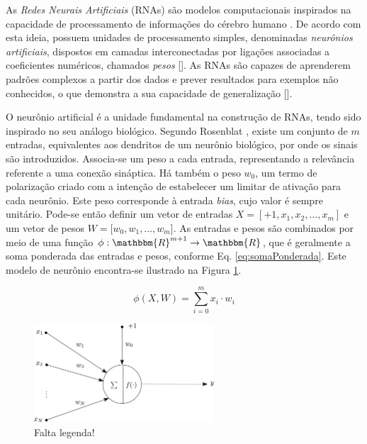 
As \emph{Redes Neurais Artificiais} (RNAs) são modelos computacionais inspirados na capacidade de processamento de informações do cérebro humano \cite{ref2:rojas}. De acordo com esta ideia, possuem unidades de processamento simples, denominadas \emph{neurônios artificiais}, dispostos em camadas interconectadas por ligações associadas a coeficientes numéricos, chamados \emph{pesos} []. As RNAs são capazes de aprenderem padrões complexos a partir dos dados e prever resultados para exemplos não conhecidos, o que demonstra a sua capacidade de generalização [].


O neurônio artificial é a unidade fundamental na construção de RNAs, tendo sido inspirado no seu análogo biológico. Segundo Rosenblat ,  existe um conjunto de $m$ entradas, equivalentes aos dendritos de um neurônio biológico, por onde os sinais são introduzidos. Associa-se um peso a cada entrada, representando a relevância referente a uma conexão sináptica. Há também o peso $w_0$, um termo de polarização criado com a intenção de estabelecer um limitar de ativação para cada neurônio. Este peso corresponde à entrada \emph{bias}, cujo valor é sempre unitário. Pode-se então definir um vetor de entradas $X = [+1, x_1, x_2, \ldots, x_m]$ e um vetor de pesos $W = [w_0, w_1, \ldots, w_m$]. As entradas e pesos são combinados por meio de uma função $\phi: \mathbbm{R}^{m+1} \rightarrow \mathbbm{R}$, que é geralmente a soma ponderada das entradas e pesos, conforme Eq. \ref{eq:somaPonderada}. Este modelo de neurônio encontra-se ilustrado na Figura \ref{img:neuronioArtificial}.

\begin{equation}
\phi(X,W) = \sum_{i =0}^m x_i \cdot w_i \label{eq:somaPonderada}
\end{equation}

\begin{figure}[h!]
	\centering
\includegraphics[width=0.6\textwidth]{./img/neuron}
\caption{Falta legenda!}\label{img:neuronioArtificial}
\end{figure}

